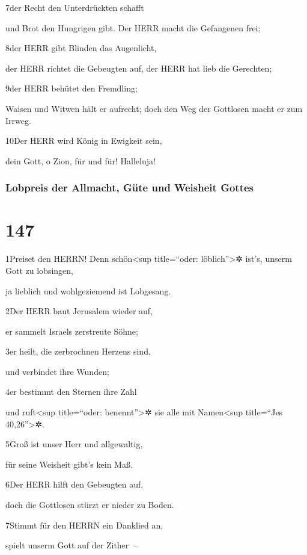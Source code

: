 7der Recht den Unterdrückten schafft

und Brot den Hungrigen gibt. Der HERR macht die Gefangenen frei;

8der HERR gibt Blinden das Augenlicht,

der HERR richtet die Gebeugten auf, der HERR hat lieb die Gerechten;

9der HERR behütet den Fremdling;

Waisen und Witwen hält er aufrecht; doch den Weg der Gottlosen macht er
zum Irrweg.

10Der HERR wird König in Ewigkeit sein,

dein Gott, o Zion, für und für! Halleluja!

\hypertarget{lobpreis-der-allmacht-guxfcte-und-weisheit-gottes}{%
\subsubsection{Lobpreis der Allmacht, Güte und Weisheit
Gottes}\label{lobpreis-der-allmacht-guxfcte-und-weisheit-gottes}}

\hypertarget{section-146}{%
\section{147}\label{section-146}}

1Preiset den HERRN! Denn schön\textless sup title=``oder:
löblich''\textgreater✲ ist's, unserm Gott zu lobsingen,

ja lieblich und wohlgeziemend ist Lobgesang.

2Der HERR baut Jerusalem wieder auf,

er sammelt Israels zerstreute Söhne;

3er heilt, die zerbrochnen Herzens sind,

und verbindet ihre Wunden;

4er bestimmt den Sternen ihre Zahl

und ruft\textless sup title=``oder: benennt''\textgreater✲ sie alle mit
Namen\textless sup title=``Jes 40,26''\textgreater✲.

5Groß ist unser Herr und allgewaltig,

für seine Weisheit gibt's kein Maß.

6Der HERR hilft den Gebeugten auf,

doch die Gottlosen stürzt er nieder zu Boden.

7Stimmt für den HERRN ein Danklied an,

spielt unserm Gott auf der Zither~--

